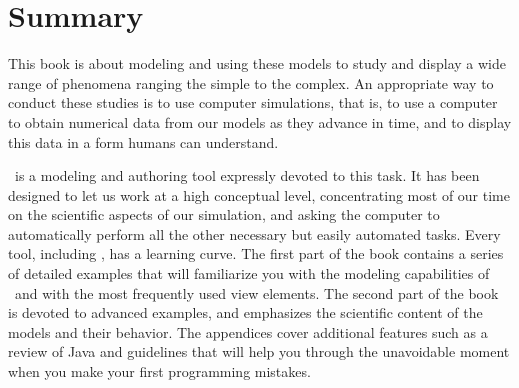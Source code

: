 \section{Summary}\label{section:02Review}

This book is about modeling and using these models to study and display a wide range
of phenomena ranging the simple to the complex. An appropriate way to conduct these studies is to use
computer simulations, that is, to use a computer to obtain numerical data from our models as they advance
in time, and to display this data in a form humans can understand.

\Ejs\ is a modeling and authoring tool expressly devoted to this task. It has been designed to let us work at a high
conceptual level, concentrating most of our time on the scientific aspects of our simulation, and asking the computer
to automatically perform all the other necessary but easily automated tasks.
Every tool, including \Ejs, has a learning curve. The first part of the book contains a series of detailed examples that will familiarize you with the modeling capabilities of \ejs\ and with the most frequently used view elements. The second part of the book is devoted to advanced examples, and emphasizes the scientific content of the models and their behavior. The appendices cover additional features such as a review of Java and guidelines that will help you through the unavoidable moment when you make your first programming mistakes.

